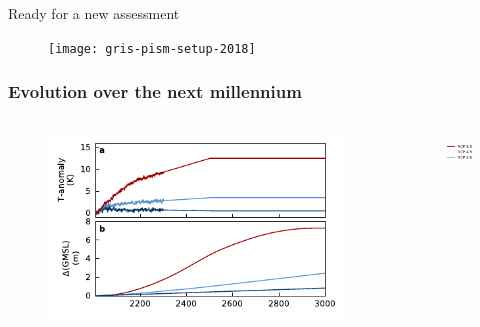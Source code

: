 \documentclass[hide notes,intlimits]{beamer}
\begin{document}
\begin{frame}{Ready for a new assessment}
  \begin{figure}
    \texttt{[image: gris-pism-setup-2018]}
  \end{figure}
\end{frame}

\begin{frame}
  \frametitle{Evolution over the next millennium}
  \begin{columns}[c]
    \begin{column}{.85\linewidth}
    \begin{figure}
    \includegraphics[width=\textwidth]{les18_ctrl}
    \end{figure}
    \end{column}
    \begin{column}{.15\linewidth}
      \begin{figure}
        \includegraphics[height=1cm]{legend-rcp}
      \end{figure}
    \end{column}
  \end{columns}
\end{frame}
\end{document}

